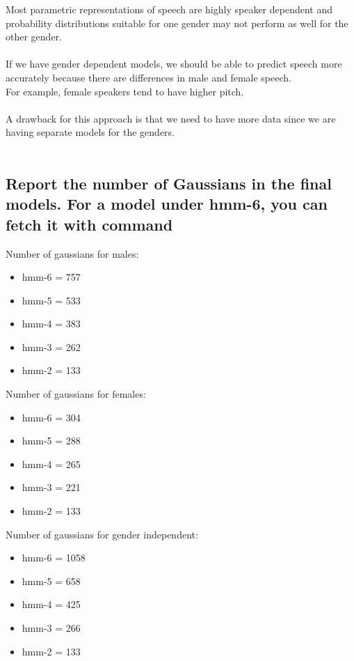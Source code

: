 \documentclass[17pt]{article}
\begin{document}
Most parametric representations of speech are highly speaker dependent and probability distributions suitable for one gender may not perform as well for the other gender. \\~\\
If we have gender dependent models, we should be able to predict speech more accurately because there are differences in male and female speech. \\
For example, female speakers tend to have higher pitch. \\~\\
A drawback for this approach is that we need to have more data since we are having separate models for the genders. \\~\\


\subsection{Report the number of Gaussians in the final models. For a model under hmm-6, you can fetch it with command}

Number of gaussians for males:
\begin{itemize}
	\item{hmm-6 = 757}
	\item{hmm-5 = 533}
	\item{hmm-4 = 383}
	\item{hmm-3 = 262}
	\item{hmm-2 = 133}
\end{itemize}


Number of gaussians for females:
\begin{itemize}
	\item{hmm-6 = 304}
	\item{hmm-5 = 288}
	\item{hmm-4 = 265}
	\item{hmm-3 = 221}
	\item{hmm-2 = 133}
\end{itemize}


Number of gaussians for gender independent:
\begin{itemize}
	\item{hmm-6 = 1058}
	\item{hmm-5 = 658}
	\item{hmm-4 = 425}
	\item{hmm-3 = 266}
	\item{hmm-2 = 133}
\end{itemize}
\end{document}

